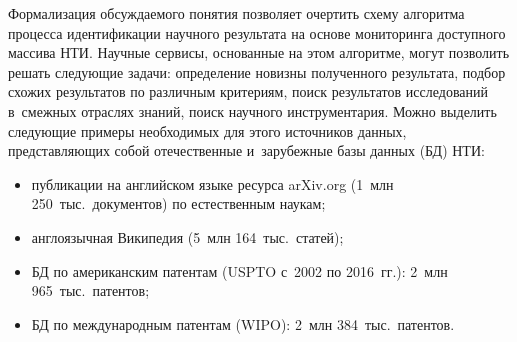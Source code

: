 \begin{multicols}{2}
    Формализация обсуждаемого понятия позволяет очертить схему 
алгоритма процесса идентификации научного результата на основе 
мониторинга доступного массива НТИ. Научные сервисы, основанные на 
этом алгоритме, могут позволить решать следующие задачи: определение 
новизны полученного результата, подбор схожих результатов по различным 
критериям, поиск результатов исследований в~смежных отраслях знаний, 
поиск научного инструментария. Можно выделить следующие примеры 
необходимых для этого источников данных, представляющих собой 
отечественные и~зарубежные базы данных (БД) НТИ:
    \begin{itemize}
\item публикации на английском языке ресурса \mbox{arXiv.org} (1~млн 250~тыс.\ 
документов) по естественным наукам;
\item англоязычная Википедия (5~млн 164~тыс.\ статей);
\item БД по американским патентам (USPTO с~2002 по 2016~гг.): 2~млн 
965~тыс.\ патентов;
\item БД по международным патентам (WIPO): 2~млн 384~тыс.\ патентов.
\end{itemize}


\end{multicols}

